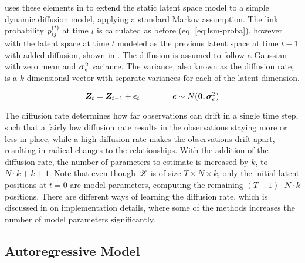     \citeauthor{zangenberg2018a} uses these elements in \cite{zangenberg2018a} to extend the static latent space model to a simple dynamic diffusion model, applying a standard Markov assumption.
    The link probability $\sub(p)^\t$ at time $t$ is calculated as before (eq. \ref{eq:lsm-proba}), however with the latent space at time $t$ modeled as the previous latent space at time $t-1$ with added diffusion, shown in . The diffusion is assumed to follow a Gaussian with zero mean and $\bm{\sigma}_\epsilon^2$ variance. The variance, also known as the diffusion rate, is a $k$-dimensional vector with separate variances for each of the latent dimension.
    
    \begin{equation}\label{eq:dsnl-space}
        \bm{Z}_t = \bm{Z}_{t-1} + \bm{\epsilon}_t \qquad\qquad \bm{\epsilon} \sim N(\bm{0},\bm{\sigma}_\epsilon^2)
    \end{equation}
    
    The diffusion rate determines how far observations can drift in a single time step, such that a fairly low diffusion rate results in the observations staying more or less in place, while a high diffusion rate makes the observations drift apart, resulting in radical changes to the relationships. With the addition of the diffusion rate, the number of parameters to estimate is increased by $k$, to $N\cdot k + k + 1$. Note that even though $\bm{\mathscr{Z}}$ is of size $T\times N\times k$, only the initial latent positions at $t=0$ are model parameters, computing the remaining $(T-1)\cdot N\cdot k$ positions. 
    There are different ways of learning the diffusion rate, which is discussed in  on implementation details, where some of the methods increases the number of model parameters significantly.
    
    

\subsection{Autoregressive Model}

